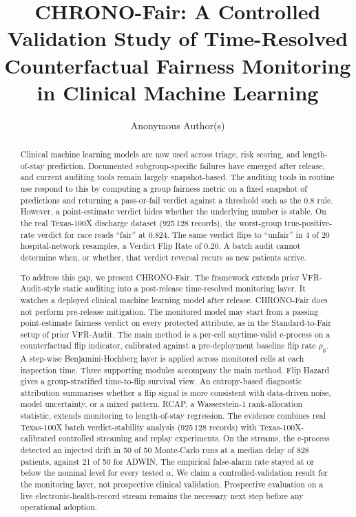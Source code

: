 \documentclass[acmsmall,nonacm,review,anonymous]{acmart}
\newcommand{\1}[1]{\mathbf{1}\!\left\{#1\right\}}
\begin{document}
\title{CHRONO-Fair: A Controlled Validation Study of Time-Resolved Counterfactual Fairness Monitoring in Clinical Machine Learning}

\author{Anonymous Author(s)}

\begin{abstract}
Clinical machine learning models are now used across triage, risk scoring, and length-of-stay prediction. Documented subgroup-specific failures have emerged after release, and current auditing tools remain largely snapshot-based. The auditing tools in routine use respond to this by computing a group fairness metric on a fixed snapshot of predictions and returning a pass-or-fail verdict against a threshold such as the 0.8 rule. However, a point-estimate verdict hides whether the underlying number is stable. On the real Texas-100X discharge dataset (925\,128 records), the worst-group true-positive-rate verdict for race reads ``fair'' at 0.824. The same verdict flips to ``unfair'' in 4 of 20 hospital-network resamples, a Verdict Flip Rate of 0.20. A batch audit cannot determine when, or whether, that verdict reversal recurs as new patients arrive.

To address this gap, we present CHRONO-Fair. The framework extends prior VFR-Audit-style static auditing into a post-release time-resolved monitoring layer. It watches a deployed clinical machine learning model after release. CHRONO-Fair does not perform pre-release mitigation. The monitored model may start from a passing point-estimate fairness verdict on every protected attribute, as in the Standard-to-Fair setup of prior VFR-Audit. The main method is a per-cell anytime-valid e-process on a counterfactual flip indicator, calibrated against a pre-deployment baseline flip rate $\rho_0$. A step-wise Benjamini-Hochberg layer is applied across monitored cells at each inspection time. Three supporting modules accompany the main method. Flip Hazard gives a group-stratified time-to-flip survival view. An entropy-based diagnostic attribution summarises whether a flip signal is more consistent with data-driven noise, model uncertainty, or a mixed pattern. RCAP, a Wasserstein-1 rank-allocation statistic, extends monitoring to length-of-stay regression. The evidence combines real Texas-100X batch verdict-stability analysis (925\,128 records) with Texas-100X-calibrated controlled streaming and replay experiments. On the streams, the e-process detected an injected drift in 50 of 50 Monte-Carlo runs at a median delay of 828 patients, against 21 of 50 for ADWIN. The empirical false-alarm rate stayed at or below the nominal level for every tested $\alpha$. We claim a controlled-validation result for the monitoring layer, not prospective clinical validation. Prospective evaluation on a live electronic-health-record stream remains the necessary next step before any operational adoption.
\end{abstract}
\end{document}
